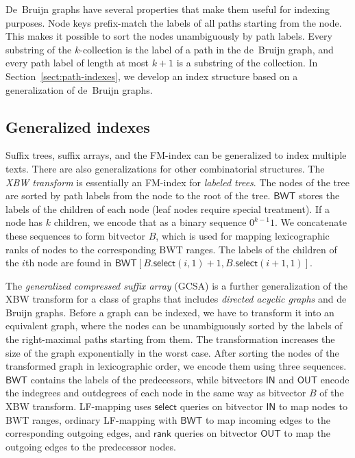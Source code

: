 \documentclass[a4paper,UKenglish]{lipics-v2016}
\newcommand{\rank}{\ensuremath{\mathsf{rank}}}
\newcommand{\select}{\ensuremath{\mathsf{select}}}
\newcommand{\kcollection}[1]{$#1$\nobreakdash-collection}
\newcommand{\LFmapping}{LF\nobreakdash-mapping}
\newcommand{\FMindex}{FM\nobreakdash-index}
\newcommand{\BWT}{\ensuremath{\mathsf{BWT}}}
\newcommand{\bvIN}{\ensuremath{\mathsf{IN}}}
\newcommand{\bvOUT}{\ensuremath{\mathsf{OUT}}}
\begin{document}
De~Bruijn graphs have several properties that make them useful for indexing purposes. Node keys prefix-match the labels of all paths starting from the node. This makes it possible to sort the nodes unambiguously by path labels. Every substring of the \kcollection{k} is the label of a path in the de~Bruijn graph, and every path label of length at most $k+1$ is a substring of the collection. In Section~\ref{sect:path-indexes}, we develop an index structure based on a generalization of de~Bruijn graphs.

\subsection{Generalized indexes}

Suffix trees, suffix arrays, and the \FMindex{} can be generalized to index multiple texts. There are also generalizations for other combinatorial structures. The \emph{XBW transform} \cite{Ferragina2009b} is essentially an \FMindex{} for \emph{labeled trees}. The nodes of the tree are sorted by path labels from the node to the root of the tree. $\BWT$ stores the labels of the children of each node (leaf nodes require special treatment). If a node has $k$ children, we encode that as a binary sequence $0^{k-1} 1$. We concatenate these sequences to form bitvector $B$, which is used for mapping lexicographic ranks of nodes to the corresponding BWT ranges. The labels of the children of the $i$th node are found in $\BWT[B.\select(i, 1) + 1, B.\select(i + 1, 1)]$.

The \emph{generalized compressed suffix array} (GCSA) \cite{Siren2014} is a further generalization of the XBW transform for a class of graphs that includes \emph{directed acyclic graphs} and de Bruijn graphs. Before a graph can be indexed, we have to transform it into an equivalent graph, where the nodes can be unambiguously sorted by the labels of the right-maximal paths starting from them. The transformation increases the size of the graph exponentially in the worst case. After sorting the nodes of the transformed graph in lexicographic order, we encode them using three sequences. $\BWT$ contains the labels of the predecessors, while bitvectors $\bvIN$ and $\bvOUT$ encode the indegrees and outdegrees of each node in the same way as bitvector $B$ of the XBW transform. \LFmapping{} uses $\select$ queries on bitvector $\bvIN$ to map nodes to BWT ranges, ordinary \LFmapping{} with $\BWT$ to map incoming edges to the corresponding outgoing edges, and $\rank$ queries on bitvector $\bvOUT$ to map the outgoing edges to the predecessor nodes.
\end{document}
